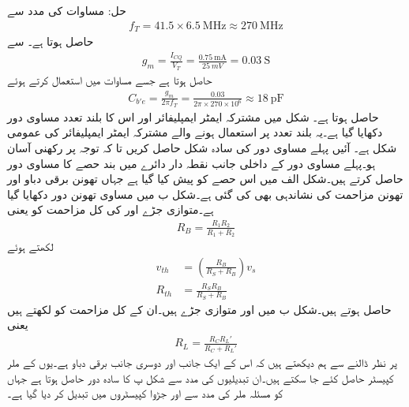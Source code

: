 حل: مساوات  کی مدد سے
\begin{align*}
f_T=41.5 \times \SI{6.5}{\mega \hertz} \approx \SI{270}{\mega \hertz}
\end{align*}
حاصل ہوتا ہے۔ سے
\begin{align*}
g_m =\frac{I_{CQ}}{V_T}=\frac{\SI{0.75}{\mA}}{\SI{25}{mV}}=\SI{0.03}{\siemens}
\end{align*}
حاصل ہوتا ہے جسے مساوات  میں استعمال کرتے ہوئے
\begin{align*}
C_{b'e}=\frac{g_m}{2 \pi f_T}=\frac{0.03}{2 \pi \times 270 \times 10^6} \approx \SI{18}{\pico \farad}
\end{align*}
حاصل ہوتا ہے۔
شکل  میں مشترکہ ایمٹر    ایمپلیفائر اور اس کا بلند تعدد مساوی دور دکھایا گیا ہے۔یہ بلند تعدد پر استعمال ہونے والے مشترکہ ایمٹر    ایمپلیفائر کی عمومی شکل ہے۔ آئیں پہلے مساوی دور کی سادہ شکل حاصل کریں تا کہ توجہ  پر رکھنی آسان ہو۔پہلے مساوی دور کے داخلی جانب نقطہ دار دائرے میں بند حصے کا مساوی  دور حاصل کرتے ہیں۔شکل  الف میں اس حصے کو پیش کیا گیا ہے جہاں تھونن برقی دباو  اور تھونن مزاحمت  کی نشاندہی بھی کی گئی ہے۔شکل  ب میں مساوی تھونن دور  دکھایا گیا ہے۔متوازی جڑے  اور  کی کل مزاحمت کو  یعنی
\begin{align} \label{مساوات_تعددی_ردعمل_بیس_مزاحمت}
R_B=\frac{R_1 R_2}{R_1+R_2}
\end{align}
لکھتے ہوئے
\begin{align} \label{مساوات_تعددی_ردعمل_تھونن_اجزاء}
v_{th}&=\left(\frac{R_B}{R_S+R_B} \right) v_s \\
R_{th}&=\frac{R_S R_B}{R_S+R_B}
\end{align}
حاصل ہوتے ہیں۔شکل  ب میں  اور  متوازی جڑے ہیں۔ان کے کل مزاحمت کو  لکھتے ہیں یعنی
\begin{align} \label{مساوات_تعددی_ردعمل_اصل_بار}
R_L=\frac{R_C R_L'}{R_C+R_L'}
\end{align}
 پر نظر ڈالنے سے ہم دیکھتے ہیں کہ اس کے ایک جانب  اور دوسری جانب  برقی دباو ہے۔یوں  کے ملر کپیسٹر حاصل کئے جا سکتے ہیں۔ان تبدیلیوں کی مدد سے شکل  پ کا سادہ دور حاصل ہوتا ہے جہاں  کو مسئلہ ملر کی مدد سے  اور  جڑوا کپیسٹروں میں تبدیل کر دیا گیا ہے۔

